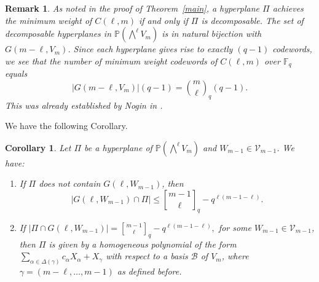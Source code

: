 \documentclass[10pt,a4paper,oneside]{amsproc}
\newtheorem{corollary}[theorem]{Corollary}
\newtheorem{remark}[theorem]{Remark}
\newcommand{\B}{\mathcal{B}}
\def\a{{\alpha}}
\def\PP{{\mathbb P}}
\newcommand{\V}{{\mathcal{V}}}
\begin{document}
\begin{remark}\normalfont
As noted in the proof of Theorem~\ref{main}, a hyperplane $\Pi$ achieves the minimum weight of $C(\ell, m)$ if and only if 
$\Pi$ is decomposable. The set of decomposable hyperplanes in $\mathbb{P}(\bigwedge^\ell V_m)$ is in natural bijection with 
$G(m-\ell, V_m)$. Since each hyperplane gives rise to exactly $(q-1)$ codewords, we see that the number of minimum weight codewords of $C(\ell, m)$ over $\mathbb{F}_q$ equals
$$
|G(m-\ell, V_m)|(q-1) =  \binom{m}{\ell}_q (q-1).
$$
This was already established by Nogin in \cite[Corollary 4.5]{N}.
\end{remark}

We have the following Corollary.

\begin{corollary}\label{cor:glm-1}
    Let $\Pi$ be a hyperplane of $\PP\left(\bigwedge^\ell V_{m} \right)$ and $W_{m-1} \in \V_{m-1}$. We have: 
    \begin{enumerate}
        \item[(a)] If $\Pi$ does not contain $G(\ell, W_{m-1})$, then $$|G(\ell, W_{m-1}) \cap \Pi| \le  {m - 1 \brack \ell}_q - q^{\ell (m-1-\ell)}.$$
        \item[(b)] If $|\Pi \cap G(\ell, W_{m-1})| = {m - 1 \brack \ell}_q - q^{\ell (m-1-\ell)},$ for some $W_{m-1} \in \V_{m-1}$, then $\Pi$ is given by a homogeneous polynomial of the form $\displaystyle{\sum_{\a \in \Delta (\gamma)}} c_\a X_\a + X_\gamma$ with respect to a basis $\B$ of $V_m$, where $\gamma = (m - \ell, \dots, m - 1)$ as defined before. 
    \end{enumerate}
\end{corollary}
\end{document}
